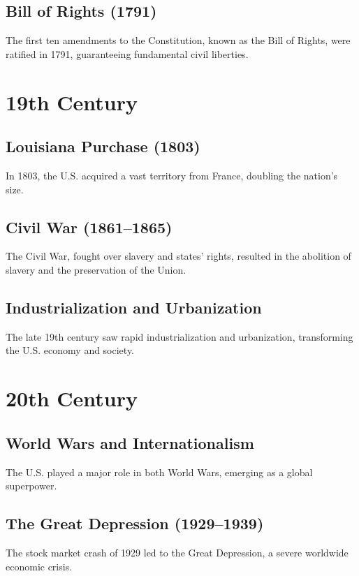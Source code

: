 \documentclass[a4paper,12pt]{book}
\begin{document}
\subsection{Bill of Rights (1791)}
\label{subsec:bill-of-rights}
The first ten amendments to the Constitution, known as the Bill of Rights, were ratified in 1791, guaranteeing fundamental civil liberties.

\section{19th Century}
\label{sec:19th-century}
\subsection{Louisiana Purchase (1803)}
\label{subsec:louisiana-purchase}
In 1803, the U.S. acquired a vast territory from France, doubling the nation’s size.

\subsection{Civil War (1861–1865)}
\label{subsec:civil-war}
The Civil War, fought over slavery and states’ rights, resulted in the abolition of slavery and the preservation of the Union.

\subsection{Industrialization and Urbanization}
\label{subsec:industrialization-urbanization}
The late 19th century saw rapid industrialization and urbanization, transforming the U.S. economy and society.

\section{20th Century}
\label{sec:20th-century}
\subsection{World Wars and Internationalism}
\label{subsec:world-wars-internationalism}
The U.S. played a major role in both World Wars, emerging as a global superpower.

\subsection{The Great Depression (1929–1939)}
\label{subsec:great-depression}
The stock market crash of 1929 led to the Great Depression, a severe worldwide economic crisis.
\end{document}

